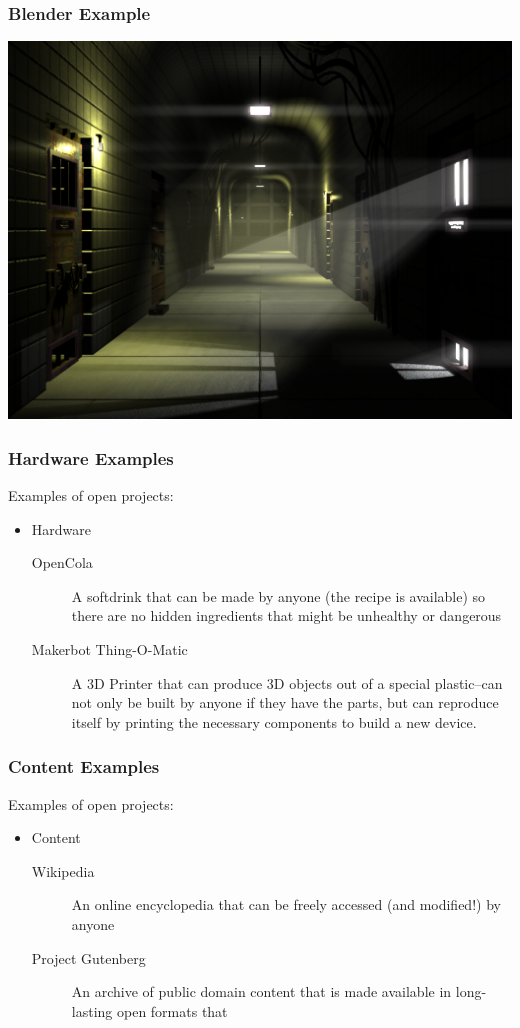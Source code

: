 \documentclass{beamer}
\begin{document}
\begin{frame}
  \frametitle{Blender Example}
    \includegraphics[width=\textwidth]{img/blendermine}
\end{frame}

\begin{frame}
  \frametitle{Hardware Examples}
  Examples of open projects:

  \begin{itemize}
  \item Hardware
    \begin{description}
    \item[OpenCola] A softdrink that can be made by anyone (the recipe
      is available) so there are no hidden ingredients that might be
      unhealthy or dangerous
    \item[Makerbot Thing-O-Matic] A \textcolor{beamer@myblue}{3D}
      Printer that can produce 3D objects out of a special
      plastic--can not only be built by anyone if they have the parts,
      but can \textcolor{beamer@myblue}{reproduce} itself by printing
      the necessary components to build a new device.
    \end{description}
  \end{itemize}
\end{frame}

\begin{frame}
  \frametitle{Content Examples}
  Examples of open projects:
  \begin{itemize}
  \item Content
    \begin{description}
    \item[Wikipedia] An online encyclopedia that can be freely accessed (and modified!) by anyone
    \item[Project Gutenberg] An archive of public domain content that is made available in long-lasting open formats that 
    \end{description}
  \end{itemize}
\end{frame}
\end{document}
